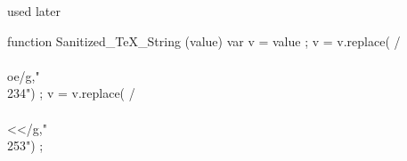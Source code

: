 


 used later 

  function Sanitized_TeX_String (value)
    { var v = value ;
      v = v.replace(  /\\\\oe/g,"\\234") ; 
      v = v.replace(  /\\\\<</g,"\\253") ;
}
